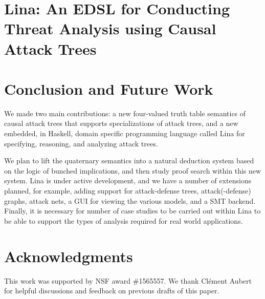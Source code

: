 \documentclass{llncs}
\begin{document}

\vspace{-7px}
\section{Lina: An EDSL for Conducting Threat Analysis using Causal Attack Trees}
\label{sec:lina:_an_edsl_for_conducting_threat_analysis_using_causal_attack_trees}


\vspace{-7px}
\section{Conclusion and Future Work}
\label{sec:conclusion}
We made two main contributions: a new four-valued truth table
semantics of causal attack trees that supports specializations of
attack trees, and a new embedded, in Haskell, domain specific
programming language called Lina for specifying, reasoning, and
analyzing attack trees.

We plan to lift the quaternary semantics into a natural deduction
system based on the logic of bunched implications, and then study
proof search within this new system.  Lina is under active
development, and we have a number of extensions planned, for example,
adding support for attack-defense trees, attack(-defense) graphs,
attack nets, a GUI for viewing the various models, and a SMT backend.
Finally, it is necessary for number of case studies to be carried out
within Lina to be able to support the types of analysis required for
real world applications.  

\vspace{-7px}
\section{Acknowledgments}
\label{sec:acknowledgments}
This work was supported by NSF award \#1565557.  We thank Cl\'ement
Aubert for helpful discussions and feedback on previous drafts of this
paper.
\end{document}
